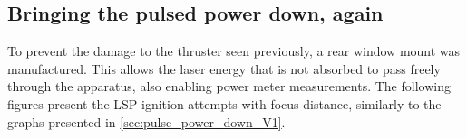 
        \subsection{Bringing the pulsed power down, again}
            
            To prevent the damage to the thruster seen previously, a rear window mount was manufactured. This allows the laser energy that is not absorbed to pass freely through the apparatus, also enabling power meter measurements. The following figures present the LSP ignition attempts with focus distance, similarly to the graphs presented in \autoref{sec:pulse_power_down_V1}. 
 

            

        



